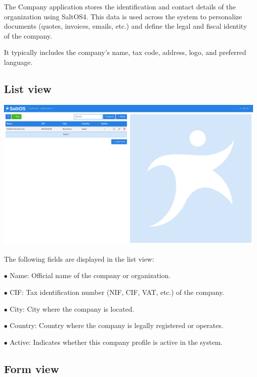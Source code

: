 \documentclass[a4paper]{article}
\begin{document}
The Company application stores the identification and contact details of the organization using SaltOS4.
This data is used across the system to personalize documents (quotes, invoices, emails, etc.) and define the legal and fiscal identity of the company.

It typically includes the company's name, tax code, address, logo, and preferred language.

\hypertarget{toc43}{}
\subsection{List view}

\begin{center}\includegraphics[width=1\textwidth]{../ujest/snaps/test-screenshots-js-screenshots-company-company-list-en-us-1-snap.png}\end{center}

The following fields are displayed in the list view:

\begin{compactitem}
\item[\color{myblue}$\bullet$] Name: Official name of the company or organization.
\item[\color{myblue}$\bullet$] CIF: Tax identification number (NIF, CIF, VAT, etc.) of the company.
\item[\color{myblue}$\bullet$] City: City where the company is located.
\item[\color{myblue}$\bullet$] Country: Country where the company is legally registered or operates.
\item[\color{myblue}$\bullet$] Active: Indicates whether this company profile is active in the system.
\end{compactitem}

\hypertarget{toc44}{}
\subsection{Form view}
\end{document}
